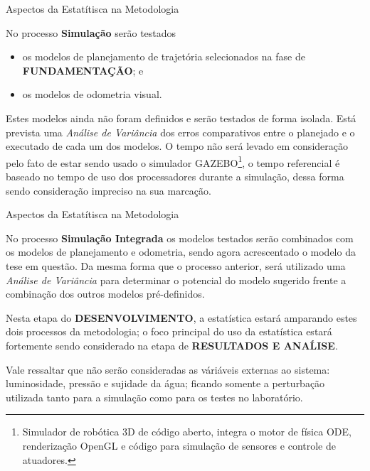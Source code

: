 \begin{frame}[t]{Aspectos da Estatítisca na Metodologia}


    No processo \textbf{Simulação} serão testados 
    \begin{itemize}
        \item os modelos de planejamento de trajetória selecionados na fase de \textbf{FUNDAMENTAÇÃO}; e
        \item os modelos de odometria visual.
    \end{itemize}
    Estes modelos ainda não foram definidos e serão testados de forma isolada. Está prevista uma \textit{Análise de Variância} dos erros comparativos entre o planejado e o executado de cada um dos modelos. 
    O tempo não será levado em consideração pelo fato de estar sendo usado o simulador GAZEBO\footnote{Simulador de robótica 3D de código aberto, integra o motor de física ODE, renderização OpenGL e código para simulação de sensores e controle de atuadores.}, o tempo referencial é baseado no tempo de uso dos processadores durante a simulação, dessa forma sendo consideração impreciso na sua marcação.

\end{frame}
\begin{frame}[t]{Aspectos da Estatítisca na Metodologia}


    No processo \textbf{Simulação Integrada} os modelos testados serão combinados com os modelos de planejamento e odometria, sendo agora acrescentado o modelo da tese em questão.
    Da mesma forma que o processo anterior, será utilizado uma \textit{Análise de Variância} para determinar o potencial do modelo sugerido frente a combinação dos outros modelos pré-definidos.
    \vspace*{0.2cm}

    Nesta etapa do \textbf{DESENVOLVIMENTO}, a estatística estará amparando estes dois processos da metodologia; o foco principal do uso da estatística estará fortemente sendo considerado na etapa de \textbf{RESULTADOS E ANAĹISE}.
    \vspace*{0.2cm}

    Vale ressaltar que não serão consideradas as váriáveis externas ao sistema: luminosidade, pressão e sujidade da água; ficando somente a perturbação utilizada tanto para a simulação como para os testes no laboratório.
\end{frame}
